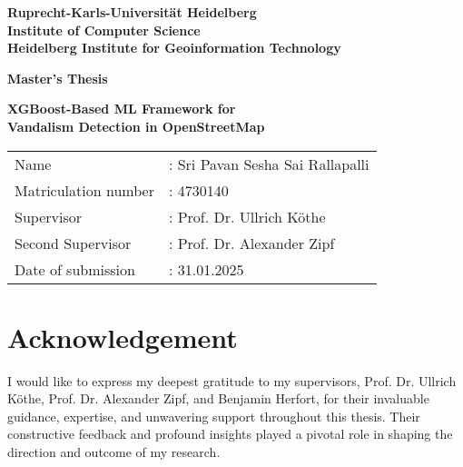 \documentclass[
    13pt, %
    a4paper, %
    twoside, 
    DIV14, %
    listof=totoc, %
    bibliography=totoc, %
    index=totoc, %
    headsepline
]{scrreprt}
\begin{document}
\begin{titlepage}

\begin{center}

\vspace*{2cm} %
\textbf{ 
\LARGE Ruprecht-Karls-Universität Heidelberg\\
\vspace*{0.5cm}
\smallskip
\Large Institute of Computer Science\\
\smallskip
\Large Heidelberg Institute for Geoinformation Technology\\
}

\vspace{2cm} %
\textbf{\large Master's Thesis} %

\textbf{\LARGE
XGBoost-Based ML Framework for \\
\vspace{0.3cm}
Vandalism Detection in OpenStreetMap
}

\vspace{2cm} %
{\large
\begin{tabular}{ll}
Name &:     Sri Pavan Sesha Sai Rallapalli\\
Matriculation number&: 4730140\\
Supervisor&:  Prof. Dr. Ullrich Köthe\\
Second Supervisor&: Prof. Dr. Alexander Zipf\\
Date of submission&:  31.01.2025
\end{tabular}
}

\end{center}

\end{titlepage}




\newpage
\thispagestyle{empty}
\null

\newpage
\section*{\LARGE Acknowledgement}

I would like to express my deepest gratitude to my supervisors, Prof. Dr. Ullrich Köthe, Prof. Dr. Alexander Zipf, and Benjamin Herfort, for their invaluable guidance, expertise, and unwavering support throughout this thesis. Their constructive feedback and profound insights played a pivotal role in shaping the direction and outcome of my research.
\end{document}
